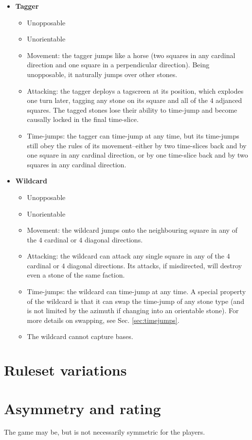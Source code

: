 \documentclass[12pt]{article}
\begin{document}
\begin{itemize}
\begin{itemize}
		\end{itemize}
	\item \textbf{Tagger}
		\begin{itemize}
		\item Unopposable
		\item Unorientable
		\item Movement: the tagger jumps like a horse (two squares in any cardinal direction and one square in a perpendicular direction). Being unopposable, it naturally jumps over other stones.
		\item Attacking: the tagger deploys a tagscreen at its position, which explodes one turn later, tagging any stone on its square and all of the $4$ adjanced squares. The tagged stones lose their ability to time-jump and become causally locked in the final time-slice.
		\item Time-jumps: the tagger can time-jump at any time, but its time-jumps still obey the rules of its movement--either by two time-slices back and by one square in any cardinal direction, or by one time-slice back and by two squares in any cardinal direction.
		\end{itemize}
	\item \textbf{Wildcard}
		\begin{itemize}
		\item Unopposable
		\item Unorientable
		\item Movement: the wildcard jumps onto the neighbouring square in any of the $4$ cardinal or $4$ diagonal directions.
		\item Attacking: the wildcard can attack any single square in any of the $4$ cardinal or $4$ diagonal directions. Its attacks, if misdirected, will destroy even a stone of the same faction.
		\item Time-jumps: the wildcard can time-jump at any time. A special property of the wildcard is that it can swap the time-jump of any stone type (and is not limited by the azimuth if changing into an orientable stone). For more details on swapping, see Sec. \ref{sec:timejumps}.
		\item The wildcard cannot capture bases.
		\end{itemize}
	\end{itemize}
	
	\section{Ruleset variations}
	
	\section{Asymmetry and rating}
	The game may be, but is not necessarily symmetric for the players.
	
	
	
	
	
	
	
	

	
	
\end{document}
